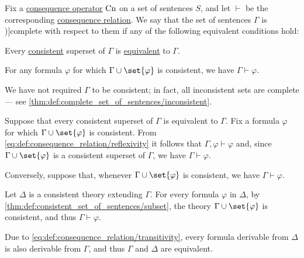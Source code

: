 \begin{definition}\label{def:complete_set_of_sentences}
  Fix a \hyperref[def:consequence_operator]{consequence operator} \( \op{Cn} \) on a set of sentences \( S \), and let \( {\vdash} \) be the corresponding \hyperref[def:consequence_relation]{consequence relation}. We say that the set of sentences \( \Gamma \) is \term[ru=полное (множество формул) (\cite[def. 1.3.16]{Герасимов2011Вычислимость})]{complete} with respect to them if any of the following equivalent conditions hold:
  \begin{thmenum}
     Every \hyperref[def:consistent_set_of_sentences]{consistent} superset of \( \Gamma \) is \hyperref[def:logical_theory/equivalent]{equivalent} to \( \Gamma \).

     For any formula \( \varphi \) for which \( \Gamma \cup \set{ \varphi } \) is consistent, we have \( \Gamma \vdash \varphi \).
  \end{thmenum}
\end{definition}
\begin{comments}
  \item We have not required \( \Gamma \) to be consistent; in fact, all inconsistent sets are complete --- see \cref{thm:def:complete_set_of_sentences/inconsistent}.
\end{comments}
\begin{defproof}
   Suppose that every consistent superset of \( \Gamma \) is equivalent to \( \Gamma \). Fix a formula \( \varphi \) for which \( \Gamma \cup \set{ \varphi } \) is consistent. From \eqref{eq:def:consequence_relation/reflexivity} it follows that \( \Gamma, \varphi \vdash \varphi \) and, since \( \Gamma \cup \set{ \varphi } \) is a consistent superset of \( \Gamma \), we have \( \Gamma \vdash \varphi \).

   Conversely, suppose that, whenever \( \Gamma \cup \set{ \varphi } \) is consistent, we have \( \Gamma \vdash \varphi \).

  Let \( \Delta \) is a consistent theory extending \( \Gamma \). For every formula \( \varphi \) in \( \Delta \), by \cref{thm:def:consistent_set_of_sentences/subset}, the theory \( \Gamma \cup \set{ \varphi } \) is consistent, and thus \( \Gamma \vdash \varphi \).

  Due to \eqref{eq:def:consequence_relation/transitivity}, every formula derivable from \( \Delta \) is also derivable from \( \Gamma \), and thus \( \Gamma \) and \( \Delta \) are equivalent.
\end{defproof}

